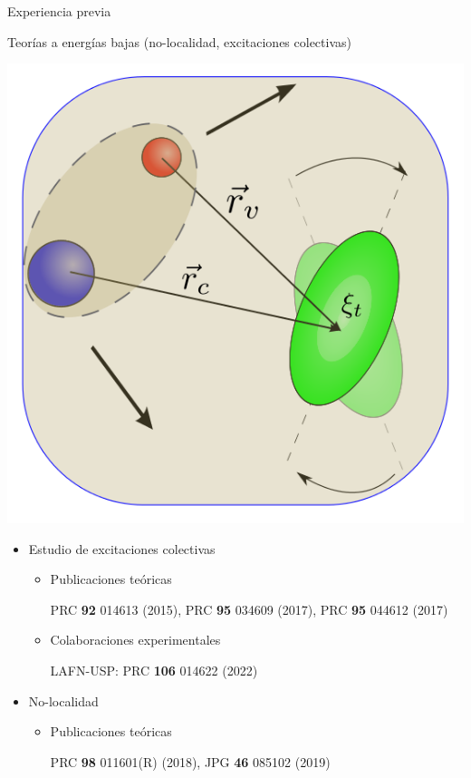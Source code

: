 \documentclass{beamer}
\begin{document}
\begin{frame}{Experiencia previa} 

   \begin{minipage}{0.45\textwidth}
     \tiny Teorías a energías bajas (no-localidad, excitaciones colectivas)    
    
    \includegraphics[height=0.3\textheight, width=\textwidth, keepaspectratio]{TExc.png}
    \end{minipage}
    \begin{minipage}{0.45\textwidth}
    \tiny
    \begin{itemize}
    \item Estudio de excitaciones colectivas
    \begin{itemize}
       \tiny
    \item Publicaciones teóricas
    
    PRC \textbf{92} 014613 (2015), PRC \textbf{95} 034609 (2017), PRC \textbf{95} 044612 (2017)
    
    \item Colaboraciones experimentales
    
    LAFN-USP: PRC \textbf{106} 014622 (2022)
    
    \end{itemize}
    \item No-localidad
    \begin{itemize}
    \tiny
    \item Publicaciones teóricas
    
    PRC \textbf{98} 011601(R) (2018),  JPG \textbf{46} 085102 (2019)
    
    \end{itemize}
    \end{itemize}
    \end{minipage}
    
\end{frame}
\end{document}
